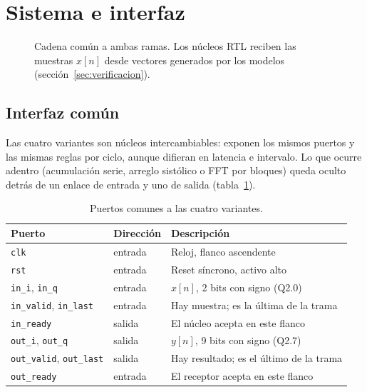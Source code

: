 \section{Sistema e interfaz}\label{sec:sistema}

\begin{figure}[h]
  \centering
  
  \caption{Cadena común a ambas ramas. Los núcleos RTL reciben las muestras $x[n]$ desde vectores generados por los modelos (sección~\ref{sec:verificacion}).}\label{fig:cadena}
\end{figure}

\subsection{Interfaz común}

Las cuatro variantes son núcleos intercambiables: exponen los mismos puertos y las mismas reglas por ciclo, aunque difieran en latencia e intervalo. Lo que ocurre adentro (acumulación serie, arreglo sistólico o FFT por bloques) queda oculto detrás de un enlace de entrada y uno de salida (tabla~\ref{tab:puertos}).

\begin{table}[h]
  \centering
  \caption{Puertos comunes a las cuatro variantes.}\label{tab:puertos}
  \small
  \begin{tabular}{lll}
    \toprule
    Puerto & Dirección & Descripción \\
    \midrule
    \texttt{clk} & entrada & Reloj, flanco ascendente \\
    \texttt{rst} & entrada & Reset síncrono, activo alto \\
    \texttt{in\_i}, \texttt{in\_q} & entrada & $x[n]$, 2 bits con signo (Q2.0) \\
    \texttt{in\_valid}, \texttt{in\_last} & entrada & Hay muestra; es la última de la trama \\
    \texttt{in\_ready} & salida & El núcleo acepta en este flanco \\
    \texttt{out\_i}, \texttt{out\_q} & salida & $y[n]$, 9 bits con signo (Q2.7) \\
    \texttt{out\_valid}, \texttt{out\_last} & salida & Hay resultado; es el último de la trama \\
    \texttt{out\_ready} & entrada & El receptor acepta en este flanco \\
    \bottomrule
  \end{tabular}
\end{table}

